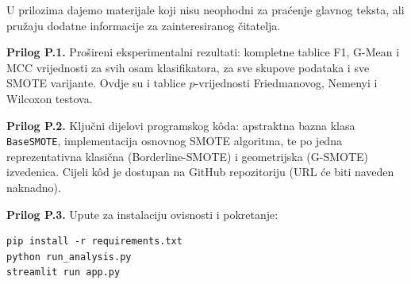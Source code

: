 
U prilozima dajemo materijale koji nisu neophodni za pra\'{c}enje
glavnog teksta, ali pru\v{z}aju dodatne informacije za zainteresiranog
\v{c}itatelja.

\textbf{Prilog P.1.} Pro\v{s}ireni eksperimentalni rezultati: kompletne
tablice F1, G-Mean i MCC vrijednosti za svih osam klasifikatora, za sve
skupove podataka i sve SMOTE varijante. Ovdje su i tablice
$p$-vrijednosti Friedmanovog, Nemenyi i Wilcoxon testova.

\textbf{Prilog P.2.} Klju\v{c}ni dijelovi programskog k\^{o}da:
apstraktna bazna klasa \texttt{BaseSMOTE}, implementacija osnovnog SMOTE
algoritma, te po jedna reprezentativna klasi\v{c}na (Borderline-SMOTE) i
geometrijska (G-SMOTE) izvedenica. Cijeli k\^{o}d je dostupan na
GitHub repozitoriju (URL \'{c}e biti naveden naknadno).

\textbf{Prilog P.3.} Upute za instalaciju ovisnosti i pokretanje:
\begin{verbatim}
pip install -r requirements.txt
python run_analysis.py
streamlit run app.py
\end{verbatim}
